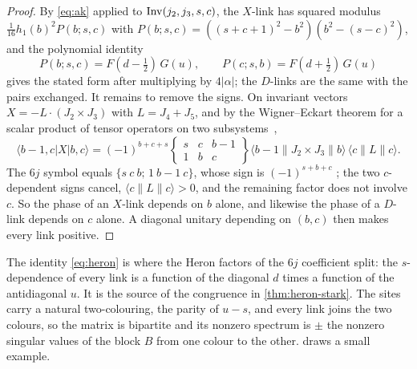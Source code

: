 \begin{proof}
By \eqref{eq:ak} applied to $\operatorname{Inv}(j_2,j_3,s,c)$, the $X$-link has squared modulus
$\frac1{16}h_1(b)^2P(b;s,c)$ with $P(b;s,c)=((s+c+1)^2-b^2)(b^2-(s-c)^2)$, and the
polynomial identity
\begin{equation}\label{eq:heron}
  P(b;s,c)=F(d-\tfrac12)\,G(u),\qquad P(c;s,b)=F(d+\tfrac12)\,G(u)
\end{equation}
gives the stated form after multiplying by $4|\alpha|$; the $D$-links are the same with
the pairs exchanged. It remains to remove the signs. On invariant vectors
$X=-L\cdot(J_2\times J_3)$ with $L=J_4+J_5$, and by the Wigner--Eckart theorem for
a scalar product of tensor operators on two subsystems~\cite[(7.1.6)]{Edmonds},
\[
  \langle b-1,c|X|b,c\rangle=(-1)^{b+c+s}\begin{Bmatrix}s&c&b-1\\1&b&c\end{Bmatrix}
  \langle b-1\|J_2\times J_3\|b\rangle\,\langle c\|L\|c\rangle .
\]
The $6j$ symbol equals $\{s\ c\ b;\,1\ b-1\ c\}$, whose sign is $(-1)^{s+b+c}$
\cite[Table~5]{Edmonds}; the two $c$-dependent signs cancel, $\langle c\|L\|c\rangle>0$,
and the remaining factor does not involve $c$. So the phase of an $X$-link depends on
$b$ alone, and likewise the phase of a $D$-link depends on $c$ alone. A diagonal
unitary depending on $(b,c)$ then makes every link positive.
\end{proof}

The identity \eqref{eq:heron} is where the Heron factors of the $6j$ coefficient
split: the $s$-dependence of every link is a function of the diagonal $d$ times a
function of the antidiagonal $u$. It is the source of the congruence in
\cref{thm:heron-stark}. The sites carry a natural two-colouring, the parity of
$u-s$, and every link joins the two colours, so the matrix is bipartite and its
nonzero spectrum is $\pm$ the nonzero singular values of the block $B$ from one colour
to the other.  draws a small example.

